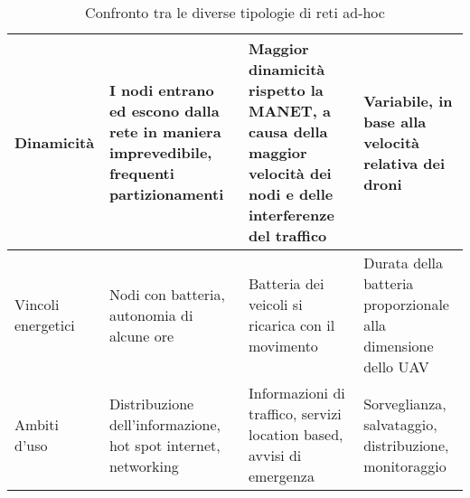 \begin{table}[]
\begin{tabular}{|p{2.2cm}|p{3cm}|p{3cm}|p{3cm}|}
		Dinamicità         & I nodi entrano ed escono dalla rete in maniera imprevedibile, frequenti partizionamenti                       & Maggior dinamicità rispetto la MANET, a causa della maggior velocità dei nodi e delle interferenze del traffico                                                                                       & Variabile, in base alla velocità relativa dei droni                                                                                       \\ \hline
		Vincoli energetici & Nodi con batteria, autonomia di alcune ore                                                                    & Batteria dei veicoli si ricarica con il movimento                                                                                                                                                     & Durata della batteria proporzionale alla dimensione dello UAV                                                                             \\ \hline
		Ambiti d'uso       & Distribuzione dell'informazione, hot spot internet, networking                                                & Informazioni di traffico, servizi location based, avvisi di emergenza                                                                                                                                 & Sorveglianza, salvataggio, distribuzione, monitoraggio                                                                                    \\ \hline
	\end{tabular}
	\caption{Confronto tra le diverse tipologie di reti ad-hoc} \label{tab:adhoc}
\end{table}

